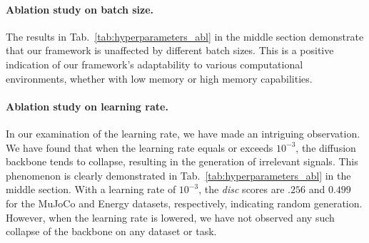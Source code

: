 \documentclass{article}
\begin{document}
\paragraph{Ablation study on batch size.} The results in Tab.~\ref{tab:hyperparameters_abl} in the middle section demonstrate that our framework is unaffected by different batch sizes. This is a positive indication of our framework's adaptability to various computational environments, whether with low memory or high memory capabilities.

\paragraph{Ablation study on learning rate.} In our examination of the learning rate, we have made an intriguing observation. We have found that when the learning rate equals or exceeds $10^{-3}$, the diffusion backbone \cite{karras2022elucidating} tends to collapse, resulting in the generation of irrelevant signals. This phenomenon is clearly demonstrated in Tab.~\ref{tab:hyperparameters_abl} in the middle section. With a learning rate of $10^{-3}$, the \textit{disc} scores are $.256$ and $0.499$ for the MuJoCo and Energy datasets, respectively, indicating random generation. However, when the learning rate is lowered, we have not observed any such collapse of the backbone on any dataset or task.
\end{document}
